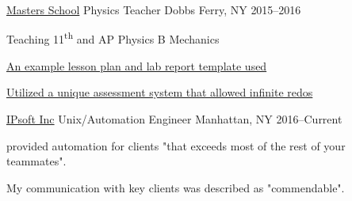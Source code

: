 \begin{cventries}
\cventry
    {\href{mastersny.org}{Masters School}}
    {Physics Teacher}
    {Dobbs Ferry, NY} {2015--2016}
    {
    \begin{cvitems}
      \item {Teaching 11\textsuperscript{th} and AP Physics B Mechanics}
      \item {\href{https://github.com/jphafner/physicsReport}{An example lesson plan and lab report template used}}
      \item {\href{https://github.com/jphafner/physicsAMC}{Utilized a unique assessment system that allowed infinite redos}}
    \end{cvitems}
    }

\cventry
    {\href{www.ipsoft.com}{IPsoft Inc}}
    {Unix/Automation Engineer}
    {Manhattan, NY}
    {2016--Current}
    {
    \begin{cvitems}
      \item {provided automation for clients "that exceeds most of the rest of your teammates".}
      \item {My communication with key clients was described as "commendable".} 
    \end{cvitems}
    }

\end{cventries}


